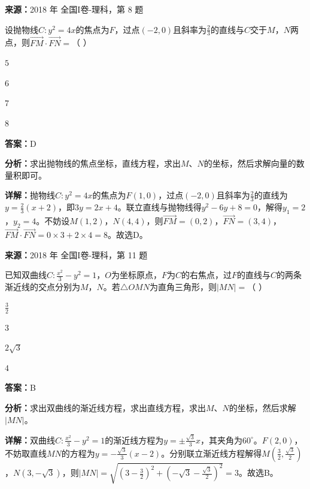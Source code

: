 \begin{question}[points=5]
\textbf{来源：}2018 年 全国I卷-理科，第 8 题\par
设抛物线$C:y^2=4x$的焦点为$F$，过点$(-2,0)$且斜率为$\frac{2}{3}$的直线与$C$交于$M$，$N$两点，则$\overrightarrow{FM}\cdot\overrightarrow{FN}=$（    ）
\begin{choices}
  \item $5$
  \item $6$
  \item $7$
  \item $8$
\end{choices}
\begin{solution}
\textbf{答案：}D

\textbf{分析：}求出抛物线的焦点坐标，直线方程，求出$M$、$N$的坐标，然后求解向量的数量积即可。

\textbf{详解：}抛物线$C:y^2=4x$的焦点为$F(1,0)$，过点$(-2,0)$且斜率为$\frac{2}{3}$的直线为$y=\frac{2}{3}(x+2)$，即$3y=2x+4$。联立直线与抛物线得$y^2-6y+8=0$，解得$y_1=2$，$y_2=4$。不妨设$M(1,2)$，$N(4,4)$，则$\overrightarrow{FM}=(0,2)$，$\overrightarrow{FN}=(3,4)$，$\overrightarrow{FM}\cdot\overrightarrow{FN}=0\times3+2\times4=8$。故选D。
\end{solution}
\end{question}

\begin{question}[points=5]
\textbf{来源：}2018 年 全国I卷-理科，第 11 题\par
已知双曲线$C:\frac{x^2}{3}-y^2=1$，$O$为坐标原点，$F$为$C$的右焦点，过$F$的直线与$C$的两条渐近线的交点分别为$M$，$N$。若$\triangle OMN$为直角三角形，则$|MN|=$（    ）
\begin{choices}
  \item $\frac{3}{2}$
  \item $3$
  \item $2\sqrt{3}$
  \item $4$
\end{choices}
\begin{solution}
\textbf{答案：}B

\textbf{分析：}求出双曲线的渐近线方程，求出直线方程，求出$M$、$N$的坐标，然后求解$|MN|$。

\textbf{详解：}双曲线$C:\frac{x^2}{3}-y^2=1$的渐近线方程为$y=\pm\frac{\sqrt{3}}{3}x$，其夹角为$60^{\circ}$。$F(2,0)$，不妨取直线$MN$的方程为$y=-\frac{\sqrt{3}}{3}(x-2)$。分别联立渐近线方程解得$M(\frac{3}{2},\frac{\sqrt{3}}{2})$，$N(3,-\sqrt{3})$，则$|MN|=\sqrt{(3-\frac{3}{2})^2+(-\sqrt{3}-\frac{\sqrt{3}}{2})^2}=3$。故选B。
\end{solution}
\end{question}

